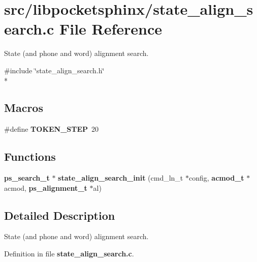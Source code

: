 \section{src/libpocketsphinx/state\-\_\-align\-\_\-search.c File Reference}
\label{state__align__search_8c}


State (and phone and word) alignment search.  


{\ttfamily \#include \char`\"{}state\-\_\-align\-\_\-search.\-h\char`\"{}}\\*
\subsection*{Macros}
\begin{DoxyCompactItemize}
\item 
\#define {\bfseries T\-O\-K\-E\-N\-\_\-\-S\-T\-E\-P}~20\label{state__align__search_8c_a197a0cf5b150b88b0e3043fd78550931}

\end{DoxyCompactItemize}
\subsection*{Functions}
\begin{DoxyCompactItemize}
\item 
{\bf ps\-\_\-search\-\_\-t} $\ast$ {\bfseries state\-\_\-align\-\_\-search\-\_\-init} (cmd\-\_\-ln\-\_\-t $\ast$config, {\bf acmod\-\_\-t} $\ast$acmod, {\bf ps\-\_\-alignment\-\_\-t} $\ast$al)\label{state__align__search_8c_a7263b71e3838f0689963439c8b695e15}

\end{DoxyCompactItemize}


\subsection{Detailed Description}
State (and phone and word) alignment search. 

Definition in file {\bf state\-\_\-align\-\_\-search.\-c}.

